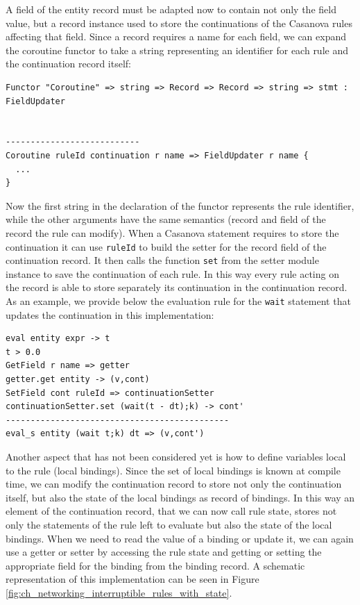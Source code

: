A field of the entity record must be adapted now to contain not only the field value, but a record instance used to store the continuations of the Casanova rules affecting that field. Since a record requires a name for each field, we can expand the coroutine functor to take a string representing an identifier for each rule and the continuation record itself:

\begin{lstlisting}
Functor "Coroutine" => string => Record => Record => string => stmt : FieldUpdater


---------------------------
Coroutine ruleId continuation r name => FieldUpdater r name {
  ...
}
\end{lstlisting}

\noindent
Now the first string in the declaration of the functor represents the rule identifier, while the other arguments have the same semantics (record and field of the record the rule can modify). When a Casanova statement requires to store the continuation it can use \texttt{ruleId} to build the setter for the record field of the continuation record. It then calls the function \texttt{set} from the setter module instance to save the continuation of each rule. In this way every rule acting on the record is able to store separately its continuation in the continuation record. As an example, we provide below the evaluation rule for the \texttt{wait} statement that updates the continuation in this implementation:

\begin{lstlisting}
eval entity expr -> t
t > 0.0
GetField r name => getter
getter.get entity -> (v,cont)
SetField cont ruleId => continuationSetter
continuationSetter.set (wait(t - dt);k) -> cont'
---------------------------------------------
eval_s entity (wait t;k) dt => (v,cont')
\end{lstlisting}

\noindent
Another aspect that has not been considered yet is how to define variables local to the rule (local bindings). Since the set of local bindings is known at compile time, we can modify the continuation record to store not only the continuation itself, but also the state of the local bindings as record of bindings. In this way an element of the continuation record, that we can now call rule state, stores not only the statements of the rule left to evaluate but also the state of the local bindings. When we need to read the value of a binding or update it, we can again use a getter or setter by accessing the rule state and getting or setting the appropriate field for the binding from the binding record. A schematic representation of this implementation can be seen in Figure \ref{fig:ch_networking_interruptible_rules_with_state}.


